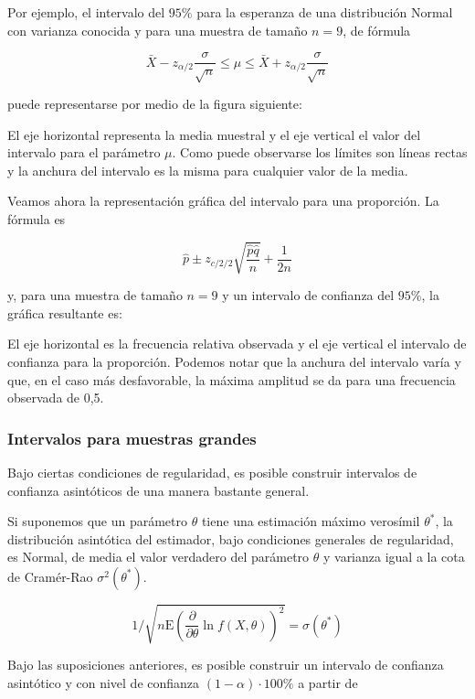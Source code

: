 \documentclass[
]{article}
\begin{document}
Por ejemplo, el intervalo del \(95 \%\) para la esperanza de una distribución Normal con varianza conocida y para una muestra de tamaño \(n=9\), de fórmula

\[
\bar{X}-z_{\alpha / 2} \frac{\sigma}{\sqrt{n}} \leq \mu \leq \bar{X}+z_{\alpha / 2} \frac{\sigma}{\sqrt{n}}
\]

puede representarse por medio de la figura siguiente:

El eje horizontal representa la media muestral y el eje vertical el valor del intervalo para el parámetro \(\mu\). Como puede observarse los límites son líneas rectas y la anchura del intervalo es la misma para cualquier valor de la media.

Veamos ahora la representación gráfica del intervalo para una proporción. La fórmula es

\[
\hat{p} \pm z_{c / 2 / 2} \sqrt{\frac{\hat{p} \hat{q}}{n}}+\frac{1}{2 n}
\]

y, para una muestra de tamaño \(n=9\) y un intervalo de confianza del \(95 \%\), la gráfica resultante es:

El eje horizontal es la frecuencia relativa observada y el eje vertical el intervalo de confianza para la proporción. Podemos notar que la anchura del intervalo varía y que, en el caso más desfavorable, la máxima amplitud se da para una frecuencia observada de 0,5.

\subsubsection{Intervalos para muestras grandes}\label{intervalos-para-muestras-grandes}

Bajo ciertas condiciones de regularidad, es posible construir intervalos de confianza asintóticos de una manera bastante general.

Si suponemos que un parámetro \(\theta\) tiene una estimación máximo verosímil \(\theta^{*}\), la distribución asintótica del estimador, bajo condiciones generales de regularidad, es Normal, de media el valor verdadero del parámetro \(\theta\) y varianza igual a la cota de Cramér-Rao \(\sigma^{2}\left(\theta^{*}\right)\).

\[
1 / \sqrt{n \mathrm{E}\left(\frac{\partial}{\partial \theta} \ln f(X, \theta)\right)^{2}}=\sigma\left(\theta^{*}\right)
\]

Bajo las suposiciones anteriores, es posible construir un intervalo de confianza asintótico y con nivel de confianza \((1-\alpha) \cdot 100 \%\) a partir de
\end{document}
